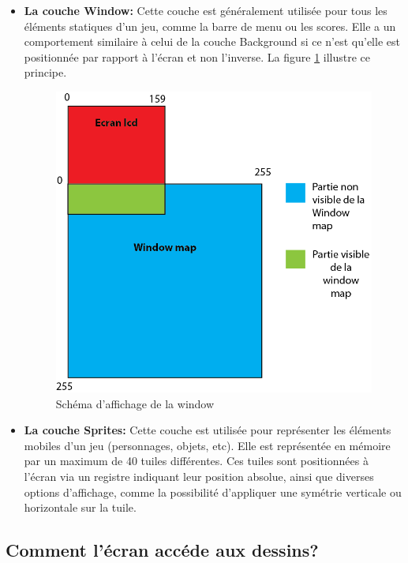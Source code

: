 \documentclass[french]{report}
\begin{document}
\begin{itemize}
\item \textbf{La couche Window:}
	Cette couche est généralement utilisée pour tous les éléments statiques
d'un jeu, comme la barre de menu ou les scores. Elle a un comportement
similaire à celui de la couche Background si ce n'est qu'elle est positionnée par rapport à l'écran et non l'inverse. La figure \ref{window} illustre ce principe.\\

\begin{figure}[!h]
\centering
\includegraphics[scale=0.8]{images/window.png}
\caption{Schéma d'affichage de la window}
\label{window}
\end{figure}

\item \textbf{La couche Sprites:}
	Cette couche est utilisée pour représenter les éléments mobiles d'un jeu (personnages, objets, etc). Elle est représentée en mémoire par un maximum
de 40 tuiles différentes. Ces tuiles sont positionnées à l'écran via un registre indiquant leur position absolue, ainsi que diverses options d'affichage, comme la possibilité d'appliquer une symétrie verticale ou horizontale sur la tuile.\\
\end{itemize}

\subsection{Comment l'écran accéde aux dessins?}
\end{document}
